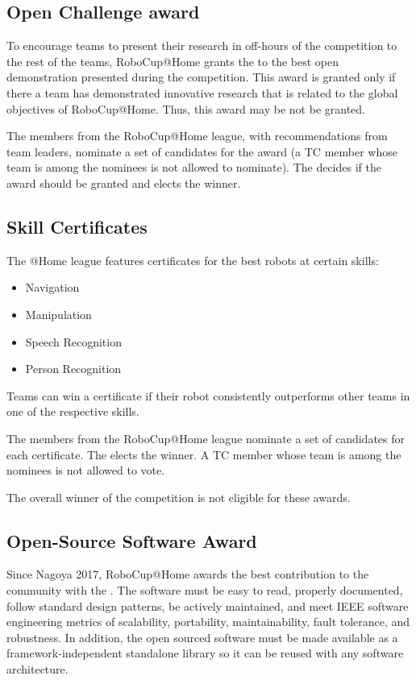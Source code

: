\subsection{Open Challenge award}
\label{award:oc}

To encourage teams to present their research in off-hours of the competition to the rest of the teams, RoboCup@Home grants the  to the best open demonstration presented during the competition. This award is granted only if there a team has demonstrated innovative research that is related to the global objectives of RoboCup@Home. Thus, this award may be not be granted.

The  members from the RoboCup@Home league, with recommendations from team leaders, nominate a set of candidates for the award (a TC member whose team is among the nominees is not allowed to nominate). The  decides if the award should be granted and elects the winner.

\subsection{Skill Certificates}
\label{award:skill}
The @Home league features certificates for the best robots at certain skills:
\begin{itemize}
   \item Navigation
   \item Manipulation
   \item Speech Recognition
   \item Person Recognition
  \end{itemize}

Teams can win a certificate if their robot consistently outperforms other teams 
in one of the respective skills.

The  members from the RoboCup@Home league 
nominate a set of candidates for each certificate. The  elects the winner. A TC member whose team is among the nominees 
is not allowed to vote.

The overall winner of the competition is not eligible for these awards.

\subsection{Open-Source Software Award}
\label{award:oss}
Since Nagoya 2017, RoboCup@Home awards the best contribution to the community 
with the . The software must be easy to read, 
properly documented, follow standard design patterns, be actively maintained, 
and meet IEEE software engineering metrics of scalability, portability, 
maintainability, fault tolerance, and robustness. In addition, the open sourced 
software must be made available as a framework-independent standalone library 
so it can be reused with any software architecture.

